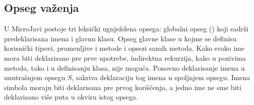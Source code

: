 \subsection*{Opseg važenja}

U MicroJavi postoje tri leksički ugnježdena opsega: globalni opseg () koji sadrži predeklarisana imena i glavnu klasu. Opseg glavne klase u kojme se definisu korisnički tipovi, promenljive i metode i opsezi samih metoda. Kako svako ime mora biti deklarisano pre prve upotrebe, indirektna rekurzija, kako u pozivima metoda, tako i u definisanju klasa, nije moguća. Ponovno deklarisanje imena u unutrašnjem opsegu $S$, sakriva deklaraciju tog imena u spoljnjem opsegu. Imena simbola moraju biti deklarisana pre prvog korišćenja, a jedno ime ne sme biti deklarisano više puta u okviru istog opsega.
